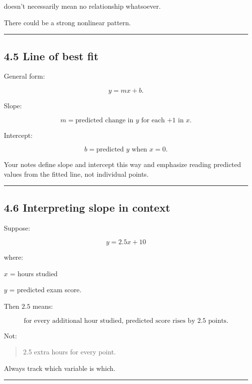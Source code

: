 \documentclass[
]{article}
\begin{document}
doesn't necessarily mean no relationship whatsoever.

There could be a strong nonlinear pattern.

\begin{center}\rule{0.5\linewidth}{0.5pt}\end{center}

\subsection{4.5 Line of best fit}\label{line-of-best-fit}

General form:

\[
\boxed{y=mx+b}.
\]

Slope:

\[
\boxed{m=\text{predicted change in }y\text{ for each +1 in }x}.
\]

Intercept:

\[
\boxed{b=\text{predicted }y\text{ when }x=0}.
\]

Your notes define slope and intercept this way and emphasize reading
predicted values from the fitted line, not individual points.

\begin{center}\rule{0.5\linewidth}{0.5pt}\end{center}

\subsection{4.6 Interpreting slope in
context}\label{interpreting-slope-in-context}

Suppose:

\[
y=2.5x+10
\]

where:

\(x\) = hours studied

\(y\) = predicted exam score.

Then \(2.5\) means:

\[
\boxed{\text{for every additional hour studied, predicted score rises by 2.5 points}}.
\]

Not:

\begin{quote}
2.5 extra hours for every point.
\end{quote}

Always track which variable is which.

\begin{center}\rule{0.5\linewidth}{0.5pt}\end{center}
\end{document}

